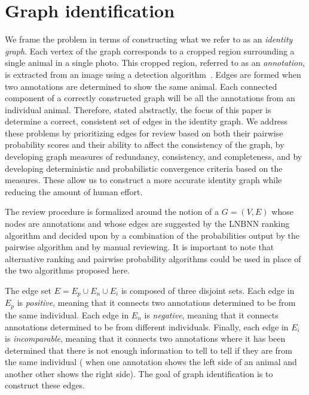 \chapter{Graph identification}\label{chap:graphid}
\newcommand{\nT}{N}


We frame the problem in terms of constructing what we refer to as an
  \emph{identity graph}.
Each vertex of the graph corresponds to a cropped region surrounding a single
  animal in a single photo.
This cropped region, referred to as an \emph{annotation}, is extracted from an
  image using a detection
  algorithm~\cite{parham_detecting_2016,redmon_you_2016}.
Edges are formed when two annotations are determined to show the same animal.
Each connected component of a correctly constructed graph will be all the
  annotations from an individual animal.
Therefore, stated abstractly, the focus of this paper is determine a correct, consistent set of
  edges in the identity graph.
We address these problems by prioritizing edges for review based on both their
  pairwise probability scores and their ability to affect the consistency of the
  graph, by developing graph measures of redundancy, consistency, and
  completeness, and by developing deterministic and probabilistic convergence
  criteria based on the measures.
These allow us to construct a more accurate identity graph while reducing the
  amount of human effort.
  



The review procedure is formalized around the notion of a %
 $G = (V, E)$ whose nodes are annotations and whose
  edges are suggested by the LNBNN ranking algorithm and decided upon by a
  combination of the probabilities output by the pairwise algorithm and by
  manual reviewing.
It is important to note that alternative ranking and pairwise probability
  algorithms could be used in place of the two algorithms proposed here.


The edge set $E = E_p \cup E_n \cup E_i$ is composed of three disjoint sets.
Each edge in $E_p$ is \emph{positive}, meaning that it connects two
  annotations determined to be from the same individual.
Each edge in $E_n$ is \emph{negative}, meaning that it connects annotations
  determined to be from different individuals.
Finally, each edge in $E_i$ is \emph{incomparable}, meaning that it connects
  two annotations where it has been determined that there is not enough
  information to tell to tell if they are from the same individual (\eg{} when
  one annotation shows the left side of an animal and another other shows the
  right side).
The goal of graph identification is to construct these edges.
  

